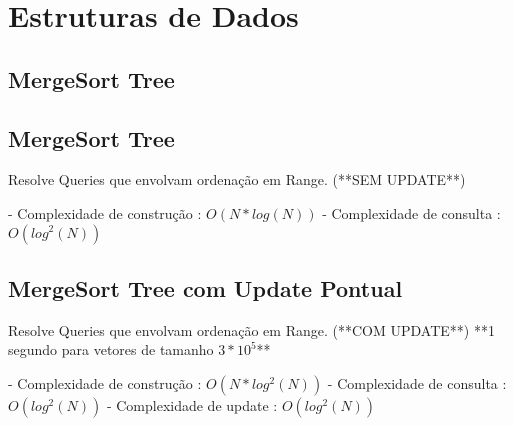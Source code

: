 \documentclass[11pt, a4paper, twoside]{article}
\begin{document}
\newpage
%
%
%
%

\section{Estruturas de Dados}

\subsection{MergeSort Tree}

\subsection{MergeSort Tree}



Resolve Queries que envolvam ordenação em Range. (**SEM UPDATE**)

- Complexidade de construção : $O(N * log(N))$
- Complexidade de consulta : $O(log^2(N))$

\subsection{MergeSort Tree com Update Pontual}


Resolve Queries que envolvam ordenação em Range. (**COM UPDATE**)  
**1 segundo para vetores de tamanho $3 * 10^5$**

- Complexidade de construção : $O(N * log^2(N))$
- Complexidade de consulta : $O(log^2(N))$
- Complexidade de update : $O(log^2(N))$
\end{document}
